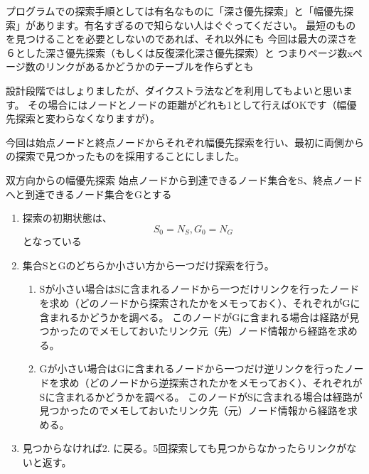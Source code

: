 プログラムでの探索手順としては有名なものに「深さ優先探索」と「幅優先探索」があります。有名すぎるので知らない人はぐぐってください。
最短のものを見つけることを必要としないのであれば、それ以外にも
今回は最大の深さを６とした深さ優先探索（もしくは反復深化深さ優先探索）と
つまりページ数xページ数のリンクがあるかどうかのテーブルを作らずとも

設計段階ではしょりましたが、ダイクストラ法などを利用してもよいと思います。
その場合にはノードとノードの距離がどれも1として行えばOKです（幅優先探索と変わらなくなりますが）。

今回は始点ノードと終点ノードからそれぞれ幅優先探索を行い、最初に両側からの探索で見つかったものを採用することにしました。

\begin{itembox}{双方向からの幅優先探索}
始点ノードから到達できるノード集合をS、終点ノードへと到達できるノード集合をGとする
\begin{enumerate}
\item 探索の初期状態は、
\[
S_0 = {N_S}, G_0 = {N_G}
\]
となっている
\item 集合SとGのどちらか小さい方から一つだけ探索を行う。
  \begin{enumerate}
    \item Sが小さい場合はSに含まれるノードから一つだけリンクを行ったノードを求め（どのノードから探索されたかをメモっておく）、それぞれがGに含まれるかどうかを調べる。
      このノードがGに含まれる場合は経路が見つかったのでメモしておいたリンク元（先）ノード情報から経路を求める。
    \item Gが小さい場合はGに含まれるノードから一つだけ逆リンクを行ったノードを求め（どのノードから逆探索されたかをメモっておく）、それぞれがSに含まれるかどうかを調べる。
      このノードがSに含まれる場合は経路が見つかったのでメモしておいたリンク先（元）ノード情報から経路を求める。
  \end{enumerate}
\item 見つからなければ2. に戻る。5回探索しても見つからなかったらリンクがないと返す。
\end{enumerate}
\end{itembox}
